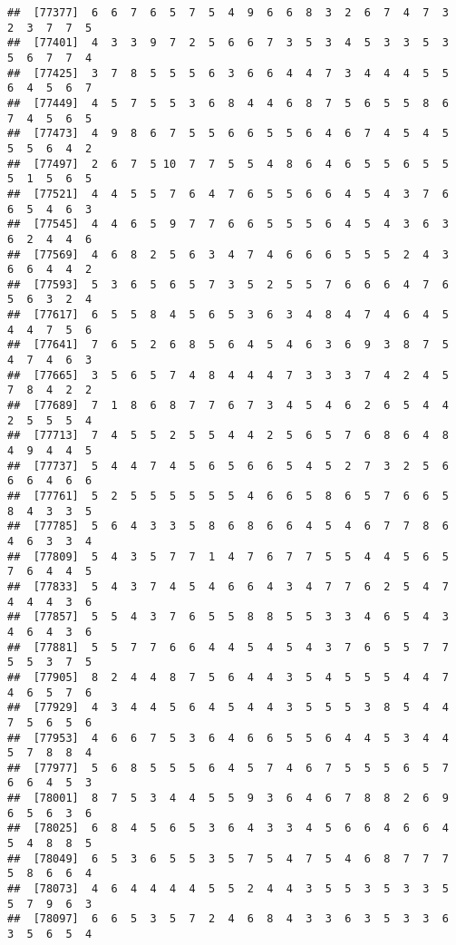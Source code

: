 \documentclass[
]{book}
\begin{document}
\begin{verbatim}
##  [77377]  6  6  7  6  5  7  5  4  9  6  6  8  3  2  6  7  4  7  3  2  3  7  7  5
##  [77401]  4  3  3  9  7  2  5  6  6  7  3  5  3  4  5  3  3  5  3  5  6  7  7  4
##  [77425]  3  7  8  5  5  5  6  3  6  6  4  4  7  3  4  4  4  5  5  6  4  5  6  7
##  [77449]  4  5  7  5  5  3  6  8  4  4  6  8  7  5  6  5  5  8  6  7  4  5  6  5
##  [77473]  4  9  8  6  7  5  5  6  6  5  5  6  4  6  7  4  5  4  5  5  5  6  4  2
##  [77497]  2  6  7  5 10  7  7  5  5  4  8  6  4  6  5  5  6  5  5  5  1  5  6  5
##  [77521]  4  4  5  5  7  6  4  7  6  5  5  6  6  4  5  4  3  7  6  6  5  4  6  3
##  [77545]  4  4  6  5  9  7  7  6  6  5  5  5  6  4  5  4  3  6  3  6  2  4  4  6
##  [77569]  4  6  8  2  5  6  3  4  7  4  6  6  6  5  5  5  2  4  3  6  6  4  4  2
##  [77593]  5  3  6  5  6  5  7  3  5  2  5  5  7  6  6  6  4  7  6  5  6  3  2  4
##  [77617]  6  5  5  8  4  5  6  5  3  6  3  4  8  4  7  4  6  4  5  4  4  7  5  6
##  [77641]  7  6  5  2  6  8  5  6  4  5  4  6  3  6  9  3  8  7  5  4  7  4  6  3
##  [77665]  3  5  6  5  7  4  8  4  4  4  7  3  3  3  7  4  2  4  5  7  8  4  2  2
##  [77689]  7  1  8  6  8  7  7  6  7  3  4  5  4  6  2  6  5  4  4  2  5  5  5  4
##  [77713]  7  4  5  5  2  5  5  4  4  2  5  6  5  7  6  8  6  4  8  4  9  4  4  5
##  [77737]  5  4  4  7  4  5  6  5  6  6  5  4  5  2  7  3  2  5  6  6  6  4  6  6
##  [77761]  5  2  5  5  5  5  5  5  4  6  6  5  8  6  5  7  6  6  5  8  4  3  3  5
##  [77785]  5  6  4  3  3  5  8  6  8  6  6  4  5  4  6  7  7  8  6  4  6  3  3  4
##  [77809]  5  4  3  5  7  7  1  4  7  6  7  7  5  5  4  4  5  6  5  7  6  4  4  5
##  [77833]  5  4  3  7  4  5  4  6  6  4  3  4  7  7  6  2  5  4  7  4  4  4  3  6
##  [77857]  5  5  4  3  7  6  5  5  8  8  5  5  3  3  4  6  5  4  3  4  6  4  3  6
##  [77881]  5  5  7  7  6  6  4  4  5  4  5  4  3  7  6  5  5  7  7  5  5  3  7  5
##  [77905]  8  2  4  4  8  7  5  6  4  4  3  5  4  5  5  5  4  4  7  4  6  5  7  6
##  [77929]  4  3  4  4  5  6  4  5  4  4  3  5  5  5  3  8  5  4  4  7  5  6  5  6
##  [77953]  4  6  6  7  5  3  6  4  6  6  5  5  6  4  4  5  3  4  4  5  7  8  8  4
##  [77977]  5  6  8  5  5  5  6  4  5  7  4  6  7  5  5  5  6  5  7  6  6  4  5  3
##  [78001]  8  7  5  3  4  4  5  5  9  3  6  4  6  7  8  8  2  6  9  6  5  6  3  6
##  [78025]  6  8  4  5  6  5  3  6  4  3  3  4  5  6  6  4  6  6  4  5  4  8  8  5
##  [78049]  6  5  3  6  5  5  3  5  7  5  4  7  5  4  6  8  7  7  7  5  8  6  6  4
##  [78073]  4  6  4  4  4  4  5  5  2  4  4  3  5  5  3  5  3  3  5  5  7  9  6  3
##  [78097]  6  6  5  3  5  7  2  4  6  8  4  3  3  6  3  5  3  3  6  3  5  6  5  4

\end{verbatim}
\end{document}
